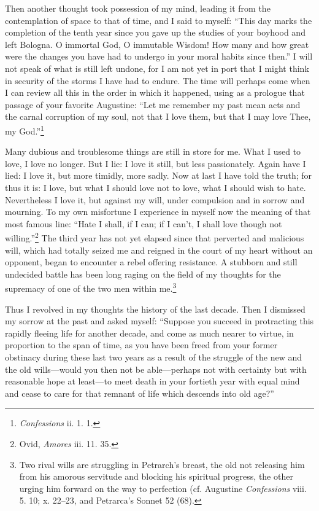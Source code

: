 Then another thought took possession of my mind, leading it from the
contemplation of space to that of time, and I said to myself: ``This
day marks the completion of the tenth year since you gave up the
studies of your boyhood and left Bologna. O immortal God, O immutable
Wisdom! How many and how great were the changes you have had to
undergo in your moral habits since then.'' I will not speak of what is
still left undone, for I am not yet in port that I might think in
security of the storms I have had to endure. The time will perhaps
come when I can review all this in the order in which it happened,
using as a prologue that passage of your favorite Augustine: ``Let me
remember my past mean acts and the carnal corruption of my soul, not
that I love them, but that I may love Thee, my
God.''\footnote{\textit{Confessions} ii. 1. 1.}

Many dubious and troublesome things are still in store for me. What I
used to love, I love no longer. But I lie: I love it still, but less
passionately. Again have I lied: I love it, but more timidly, more
sadly. Now at last I have told the truth; for thus it is: I love, but
what I should love not to love, what I should wish to hate.
Nevertheless I love it, but against my will, under compulsion and in
sorrow and mourning. To my own misfortune I experience in myself now
the meaning of that most famous line: ``Hate I shall, if I can; if I
can't, I shall love though not willing.''\footnote{Ovid,
\textit{Amores} iii. 11. 35.} The third year has not yet elapsed since
that perverted and malicious will, which had totally seized me and
 reigned in the court of my heart without an opponent, began
to encounter a rebel offering resistance. A stubborn and still
undecided battle has been long raging on the field of my thoughts for
the supremacy of one of the two men within me.\footnote{Two rival
wills are struggling in Petrarch's breast, the old not releasing him
from his amorous servitude and blocking his spiritual progress, the
other urging him forward on the way to perfection (cf. Augustine
\textit{Confessions} viii. 5. 10; x. 22--23, and Petrarca's Sonnet 52
(68).}

Thus I revolved in my thoughts the history of the last decade. Then I
dismissed my sorrow at the past and asked myself: ``Suppose you
succeed in protracting this rapidly fleeing life for another decade,
and come as much nearer to virtue, in proportion to the span of time,
as you have been freed from your former obstinacy during these last
two years as a result of the struggle of the new and the old
wills---would you then not be able---perhaps not with certainty but
with reasonable hope at least---to meet death in your fortieth year
with equal mind and cease to care for that remnant of life which
descends into old age?''


